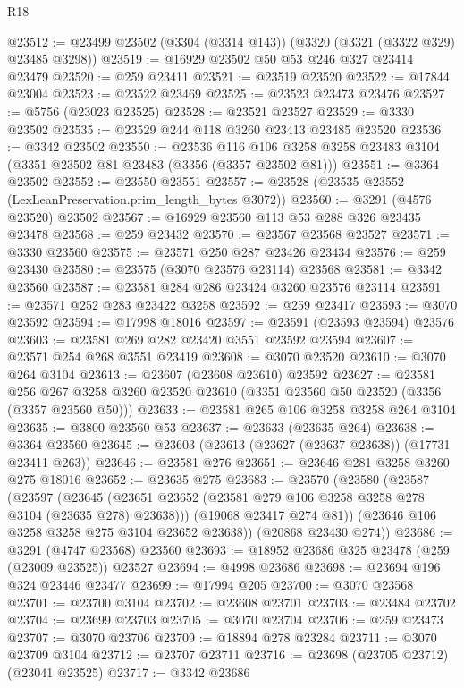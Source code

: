 \begin{lexlean}{R18}
\begin{coremodule}
@23512 := @23499 @23502 (@3304 (@3314 @143)) (@3320 (@3321 (@3322 @329) @23485 @3298))
@23519 := @16929 @23502 @50 @53 @246 @327 @23414 @23479
@23520 := @259 @23411
@23521 := @23519 @23520
@23522 := @17844 @23004
@23523 := @23522 @23469
@23525 := @23523 @23473 @23476
@23527 := @5756 (@23023 @23525)
@23528 := @23521 @23527
@23529 := @3330 @23502
@23535 := @23529 @244 @118 @3260 @23413 @23485 @23520
@23536 := @3342 @23502
@23550 := @23536
    @116
    @106
    @3258
    @3258
    @23483
    @3104
    (@3351 @23502 @81 @23483 (@3356 (@3357 @23502 @81)))
@23551 := @3364 @23502
@23552 := @23550 @23551
@23557 := @23528 (@23535 @23552 (LexLeanPreservation.prim_length_bytes @3072))
@23560 := @3291 (@4576 @23520) @23502
@23567 := @16929 @23560 @113 @53 @288 @326 @23435 @23478
@23568 := @259 @23432
@23570 := @23567 @23568 @23527
@23571 := @3330 @23560
@23575 := @23571 @250 @287 @23426 @23434
@23576 := @259 @23430
@23580 := @23575 (@3070 @23576 @23114) @23568
@23581 := @3342 @23560
@23587 := @23581 @284 @286 @23424 @3260 @23576 @23114
@23591 := @23571 @252 @283 @23422 @3258
@23592 := @259 @23417
@23593 := @3070 @23592
@23594 := @17998 @18016
@23597 := @23591 (@23593 @23594) @23576
@23603 := @23581 @269 @282 @23420 @3551 @23592 @23594
@23607 := @23571 @254 @268 @3551 @23419
@23608 := @3070 @23520
@23610 := @3070 @264 @3104
@23613 := @23607 (@23608 @23610) @23592
@23627 := @23581
    @256
    @267
    @3258
    @3260
    @23520
    @23610
    (@3351 @23560 @50 @23520 (@3356 (@3357 @23560 @50)))
@23633 := @23581 @265 @106 @3258 @3258 @264 @3104
@23635 := @3800 @23560 @53
@23637 := @23633 (@23635 @264)
@23638 := @3364 @23560
@23645 := @23603 (@23613 (@23627 (@23637 @23638)) (@17731 @23411 @263))
@23646 := @23581 @276
@23651 := @23646 @281 @3258 @3260 @275 @18016
@23652 := @23635 @275
@23683 := @23570
    (@23580
      (@23587
        (@23597
          (@23645 (@23651 @23652 (@23581 @279 @106 @3258 @3258 @278 @3104 (@23635 @278) @23638)))
          (@19068 @23417 @274 @81))
        (@23646 @106 @3258 @3258 @275 @3104 @23652 @23638))
      (@20868 @23430 @274))
@23686 := @3291 (@4747 @23568) @23560
@23693 := @18952 @23686 @325 @23478 (@259 (@23009 @23525)) @23527
@23694 := @4998 @23686
@23698 := @23694 @196 @324 @23446 @23477
@23699 := @17994 @205
@23700 := @3070 @23568
@23701 := @23700 @3104
@23702 := @23608 @23701
@23703 := @23484 @23702
@23704 := @23699 @23703
@23705 := @3070 @23704
@23706 := @259 @23473
@23707 := @3070 @23706
@23709 := @18894 @278 @23284
@23711 := @3070 @23709 @3104
@23712 := @23707 @23711
@23716 := @23698 (@23705 @23712) (@23041 @23525)
@23717 := @3342 @23686

\end{coremodule}
\end{lexlean}
